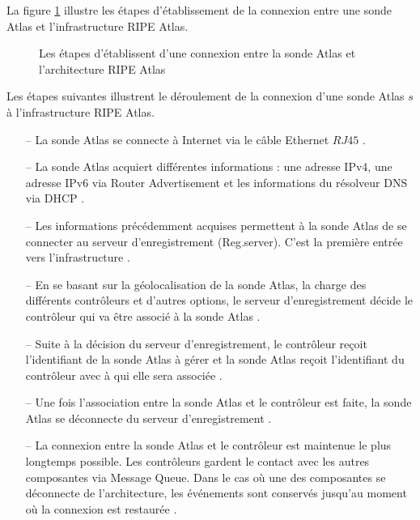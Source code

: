 La figure \ref{fig:deroulement-connexion-ripe-atlas} illustre les étapes d'établissement de la connexion entre une sonde Atlas  et  l'infrastructure RIPE Atlas.

\begin{figure}[H]
	\captionsetup{justification=centering}
	\centering
	\resizebox{\textwidth}{!}{
		 
	}
	\caption{Les étapes d'établissent d'une connexion entre la sonde Atlas et l'architecture  RIPE Atlas}
	\label{fig:deroulement-connexion-ripe-atlas}
\end{figure}


Les étapes suivantes illustrent le déroulement de la connexion d'une sonde Atlas $s$ à l'infrastructure RIPE Atlas. 

\begin{itemize}
	\item[--] La sonde Atlas se connecte à Internet via  le câble Ethernet $RJ45$ .
	\item[--] La sonde Atlas acquiert différentes informations : une adresse IPv4, une adresse IPv6 via Router Advertisement et les informations du résolveur DNS via DHCP . 
	
	\item[--] Les informations précédemment acquises permettent à la sonde Atlas de se connecter  au serveur d'enregistrement (Reg.server). C'est la première entrée vers l'infrastructure .
	
	\item[--] En se basant sur la géolocalisation de la sonde Atlas, la charge des différents contrôleurs et d'autres options,  le serveur d'enregistrement décide le contrôleur qui va  être associé à la sonde Atlas . 
	
	\item[--] Suite à la décision du serveur d'enregistrement, le contrôleur reçoit l'identifiant de la sonde Atlas à gérer et la sonde Atlas reçoit l'identifiant du contrôleur avec à qui elle sera associée .
	
	\item[--]  Une fois l'association entre la sonde Atlas et le contrôleur est faite,  la sonde Atlas se déconnecte du serveur d'enregistrement .
	
	\item[--] La connexion entre la sonde Atlas et le contrôleur est  maintenue le plus longtemps possible. Les contrôleurs gardent le contact avec les autres composantes via Message Queue. Dans le cas où  une des composantes se déconnecte de l'architecture, les événements sont conservés jusqu'au moment où la connexion est restaurée .
	
\end{itemize}


